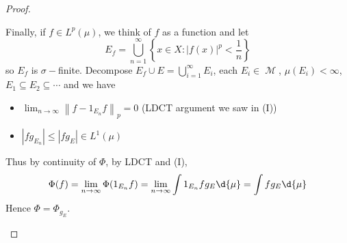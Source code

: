 \documentclass[11pt, a4paper]{memoir}
\newcommand{\norm}[1]{\ensuremath{\left\lVert#1\right\rVert}}
\theoremstyle{change}
\theoremstyle{plain}
\theoremstyle{nonumberplain}
\newtheorem{proof}{Proof}
\DeclareMathOperator{\M}{{\mathcal{M}}}
\begin{document}
\begin{proof}
\begin{enumerate}[label=(\roman*)]
            Finally, if $f\in L^p(\mu)$, we think of $f$ as a function and let
            \begin{equation*}
                E_f=\bigcup_{n=1}^\infty\left\{x\in X:|f(x)|^p<\frac{1}{n}\right\}
            \end{equation*}
            so $E_f$ is $\sigma-$finite.
            Decompose $E_f\cup E=\bigcup_{i=1}^\infty E_i$, each $E_i\in\M$, $\mu(E_i)<\infty$, $E_1\subseteq E_2\subseteq\cdots$ and we have
            \begin{itemize}[nolistsep]
                \item $\lim_{n\to\infty}\norm{f-1_{E_n}f}_p=0$ (LDCT argument we saw in (I))
                \item $|fg_{E_n}|\leq|fg_E|\in L^1(\mu)$
            \end{itemize}
            Thus by continuity of $\Phi$, by LDCT and (I),
            \begin{equation*}
                \Phi(f)=\lim_{n\to\infty}\Phi(1_{E_n}f)=\lim_{n\to\infty}\int 1_{E_n}fg_E\d{\mu}=\int fg_E\d{\mu}
            \end{equation*}
            Hence $\Phi=\Phi_{g_E}$.
    \end{enumerate}
\end{proof}
\end{document}
